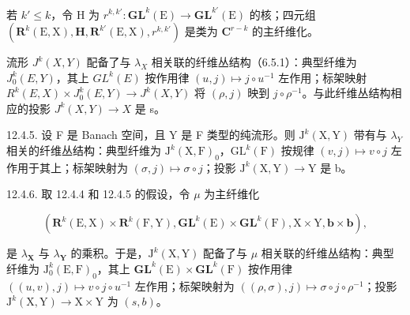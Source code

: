 若 \(k' \leqslant k\)，令 H 为 \(r^{k, k'} \colon \mathbf{GL}^{k}(\mathrm{E}) \to \mathbf{GL}^{k'}(\mathrm{E})\) 的核；四元组 \((\mathbf{R}^k(\mathrm{E}, \mathrm{X}), \mathbf{H}, \mathbf{R}^{k'}(\mathrm{E}, \mathrm{X}), r^{k, k'})\) 是类为 \(\mathbf{C}^{r-k}\) 的主纤维化。

流形 \(J^{k}(X,Y)\) 配备了与 \(\lambda_{X}\) 相关联的纤维丛结构（6.5.1）：典型纤维为 \(J_{0}^{k}(E,Y)\)，其上 \(GL^{k}(E)\) 按作用律 \((u,j)\mapsto j\circ u^{-1}\) 左作用；标架映射 \(R^{k}(E,X)\times J_{0}^{k}(E,Y)\to J^{k}(X,Y)\) 将 \((\rho,j)\) 映到 \(j\circ\rho^{-1}\)。与此纤维丛结构相应的投影 \(J^{k}(X,Y)\to X\) 是 s。

12.4.5. 设 F 是 Banach 空间，且 Y 是 F 类型的纯流形。则 \(\mathrm{J}^{k}(\mathrm{X},\mathrm{Y})\) 带有与 \(\lambda_{Y}\) 相关的纤维丛结构：典型纤维为 \(\mathrm{J}^{k}(\mathrm{X},\mathrm{F})_{0}\)，\(\mathrm{GL}^{k}(\mathrm{F})\) 按规律 \((v,j)\mapsto v\circ j\) 左作用于其上；标架映射为 \((\sigma,j)\mapsto\sigma\circ j\)；投影 \(\mathrm{J}^{k}(\mathrm{X},\mathrm{Y})\to\mathrm{Y}\) 是 b。

12.4.6. 取 12.4.4 和 12.4.5 的假设，令 \(\mu\) 为主纤维化

\[
(\mathbf {R} ^ {k} (\mathrm{E}, \mathrm{X}) \times \mathbf {R} ^ {k} (\mathrm{F}, \mathrm{Y}), \mathbf {G L} ^ {k} (\mathrm{E}) \times \mathbf {G L} ^ {k} (\mathrm{F}), \mathrm{X} \times \mathrm{Y}, \boldsymbol {b} \times \boldsymbol {b}),
\]

是 \(\lambda_{\mathbf{X}}\) 与 \(\lambda_{\mathbf{Y}}\) 的乘积。于是，\(\mathrm{J}^{k}(\mathrm{X},\mathrm{Y})\) 配备了与 \(\mu\) 相关联的纤维丛结构：典型纤维为 \(\mathrm{J}_{0}^{k}(\mathrm{E},\mathrm{F})_{0}\)，其上 \(\mathbf{GL}^{k}(\mathrm{E})\times \mathbf{GL}^{k}(\mathrm{F})\) 按作用律 \(((u,v),j)\mapsto v\circ j\circ u^{-1}\) 左作用；标架映射为 \(((\rho ,\sigma),j)\mapsto \sigma \circ j\circ \rho^{-1}\)；投影 \(\mathrm{J}^k (\mathrm{X},\mathrm{Y})\to \mathrm{X}\times \mathrm{Y}\) 为 \((s,b)\)。

